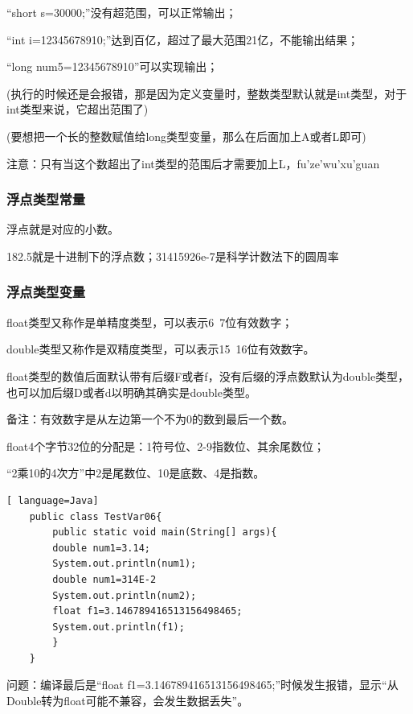 \documentclass{article}
\begin{document}
	“short s=30000;”没有超范围，可以正常输出；
	
	“int i=12345678910;”达到百亿，超过了最大范围21亿，不能输出结果；
	
	“long num5=12345678910”可以实现输出；
	
	(执行的时候还是会报错，那是因为定义变量时，整数类型默认就是int类型，对于int类型来说，它超出范围了)
	
	(要想把一个长的整数赋值给long类型变量，那么在后面加上A或者L即可)
	
	\setlength{\parindent}{2em}注意：只有当这个数超出了int类型的范围后才需要加上L，fu'ze'wu'xu'guan
	
	\subsubsection{浮点类型常量}
	
	浮点就是对应的小数。
	
	182.5就是十进制下的浮点数；31415926e-7是科学计数法下的圆周率
	
	\subsubsection{浮点类型变量}
	
	float类型又称作是单精度类型，可以表示6~7位有效数字；
	
	double类型又称作是双精度类型，可以表示15~16位有效数字。
	
	float类型的数值后面默认带有后缀F或者f，没有后缀的浮点数默认为double类型，也可以加后缀D或者d以明确其确实是double类型。
	
	备注：有效数字是从左边第一个不为0的数到最后一个数。
	
	\setlength{\parindent}{5em}float4个字节32位的分配是：1符号位、2-9指数位、其余尾数位；
	
	“2乘10的4次方”中2是尾数位、10是底数、4是指数。
	
	\setlength{\parindent}{2em}
	
	\begin{lstlisting}[ language=Java]
	public class TestVar06{
		public static void main(String[] args){
		double num1=3.14;
		System.out.println(num1);
		double num1=314E-2
		System.out.println(num2);
		float f1=3.146789416513156498465;
		System.out.println(f1);
		}
	}
	\end{lstlisting}
	
	问题：编译最后是“float f1=3.146789416513156498465;”时候发生报错，显示“从Double转为float可能不兼容，会发生数据丢失”。
	
\end{document}
